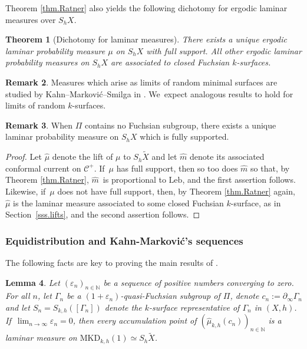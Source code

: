 \documentclass[JEP,XML,SOM,Unicode,NoEqCountersInSection,published]{cedram}
\newcommand{\ksurface}{$k$\nobreakdash-surface\xspace}
\newcommand{\ksurfaces}{$k$\nobreakdash-surfaces\xspace}
\theoremstyle{plain}
\newtheorem{theorem}{Theorem}[section]
\newtheorem{lemma}[theorem]{Lemma}
\theoremstyle{definition}
\newtheorem{remark}[theorem]{Remark}
\newcommand{\cC}{{\mathcal C}}
\let\eps\varepsilon
\newcommand{\Leb}{\mathrm{Leb}}
\newcommand{\MKD}{\mathrm{MKD}}
\newcommand{\bord}{\partial_{\infty}}
\begin{document}
Theorem \ref{thm.Ratner} also yields the following dichotomy for ergodic laminar measures over $S_hX$.

\begin{theorem}[Dichotomy for laminar measures]\label{thm.dichotomy_laminar} There exists a unique ergodic laminar probability measure $\mu$ on $S_hX$ with full support. All other ergodic laminar probability measures on $S_hX$ are associated to closed Fuchsian \ksurfaces.
\end{theorem}

\begin{remark}
Measures which arise as limits of random minimal surfaces are studied by Kahn--Markovi\'c--Smilga in \cite{KMS}. We~expect analogous results to hold for limits of random \ksurfaces.
\end{remark}

\begin{remark}
When $\Pi$ contains no Fuchsian subgroup, there exists a unique laminar probability measure on $S_hX$ which is fully supported.
\end{remark}

\begin{proof}
Let $\hat\mu$ denote the lift of $\mu$ to $S_h\tilde{X}$ and let $\hat m$ denote its associated conformal current on $\cC^+$. If~$\mu$ has full support, then so too does $\hat m$ so that, by Theorem \ref{thm.Ratner}, $\hat m$~is proportional to $\Leb$, and the first assertion follows. Likewise, if~$\mu$ does not have full support, then, by Theorem \ref{thm.Ratner} again, $\hat\mu$ is the laminar measure associated to some closed Fuchsian \ksurface, as in Section~\ref{sss.lifts}, and the second assertion follows.
\end{proof}

\subsubsection{Equidistribution and Kahn-Markovi\'c's sequences} The following facts are key to proving the main results of \cite{ALS}.

\begin{lemma}\label{lem.conv_fuchsian}
Let $(\eps_n)_{n\in\mathbb{N}}$ be a sequence of positive numbers converging to zero. For all $n$, let $\Gamma_n$ be a $(1+\eps_n)$-quasi-Fuchsian subgroup of $\Pi$, denote $c_n:=\bord\Gamma_n$ and let $S_n=S_{k,h}([\Gamma_n])$ denote the \ksurface representative of $\Gamma_n$ in $(X,h)$. If~$\lim_{n\to\infty}\eps_n=0$, then every accumulation point of $(\hat\mu_{k,h}(c_n))_{n\in\mathbb{N}}$ is a laminar measure on $\MKD_{k,h}(1)\simeq S_{h}\tilde{X}$.
\end{lemma}
\end{document}
